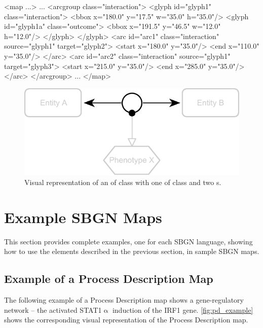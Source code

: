 \begin{example}
<map ...>
    ...
    <arcgroup class="interaction">
        <glyph id="glyph1" class="interaction">
            <bbox x="180.0" y="17.5" w="35.0" h="35.0"/>
            <glyph id="glyph1a" class="outcome">
                <bbox x="191.5" y="46.5" w="12.0" h="12.0"/>
            </glyph>
        </glyph>
        <arc id="arc1" class="interaction" source="glyph1" target="glyph2">
            <start x="180.0" y="35.0"/>
            <end x="110.0" y="35.0"/>
        </arc>
        <arc id="arc2" class="interaction" source="glyph1" target="glyph3">
            <start x="215.0" y="35.0"/>
            <end x="285.0" y="35.0"/>
        </arc>
    </arcgroup>
    ...
</map>
\end{example}

\begin{figure}[!ht]
  \centering
  \includegraphics[scale=0.9]{figures/arcgroup_example_v2.pdf}
\caption{Visual representation of an \ArcGroup of class  with one \Glyph of class  and two \Arc{}s.}
  \label{fig:arcgroup_example}
\end{figure}


\section{Example SBGN Maps}
\label{examples}

This section provides complete examples, one for each SBGN language, showing how to use the elements described in the previous section, in sample SBGN maps.

\subsection{Example of a Process Description Map}

The following example of a Process Description map shows a gene-regulatory network -- the activated STAT1$\upalpha$ induction of the IRF1 gene. \ref{fig:pd_example} shows the corresponding visual representation of the Process Description map.

